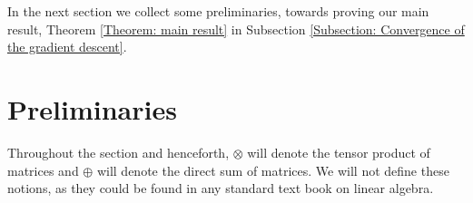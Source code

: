 \documentclass[a4paper,11pt]{amsart}
\theoremstyle{definition}
\theoremstyle{plain}
\newtheorem{thm}[dfn]{Theorem}
\theoremstyle{remark}
\newcommand{\IR}{\mathbb{R}}
\newcommand{\ot}{\otimes}
\begin{document}

In the next section we collect some preliminaries, towards proving our main result, Theorem \ref{Theorem: main result} in Subsection \ref{Subsection: Convergence of the gradient descent}.
\section{Preliminaries}
Throughout the section and henceforth, $\ot$ will denote the tensor product of matrices and $\oplus$ will denote the direct sum of matrices. We will not define these notions, as they could be found in any standard text book on linear algebra.
\end{document}
